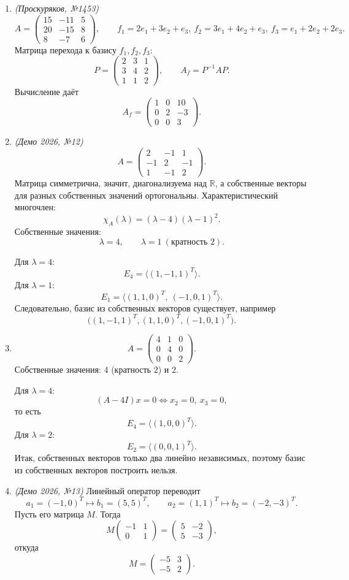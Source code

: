 \begin{enumerate}
\item \textit{(Проскуряков, №1453)}
\[
A=\begin{pmatrix}
15&-11&5\\
20&-15&8\\
8&-7&6
\end{pmatrix},\qquad
f_1=2e_1+3e_2+e_3,\ 
f_2=3e_1+4e_2+e_3,\ 
f_3=e_1+2e_2+2e_3.
\]
Матрица перехода к базису \(f_1,f_2,f_3\):
\[
P=\begin{pmatrix}
2&3&1\\
3&4&2\\
1&1&2
\end{pmatrix},
\qquad
A_f=P^{-1}AP.
\]
Вычисление даёт
\[
A_f=
\begin{pmatrix}
1&0&10\\
0&2&-3\\
0&0&3
\end{pmatrix}.
\]

\item \textit{(Демо 2026, №12)}
\[
A=\begin{pmatrix}
2&-1&1\\
-1&2&-1\\
1&-1&2
\end{pmatrix}.
\]
Матрица симметрична, значит, диагонализуема над \(\mathbb R\), а собственные векторы для разных собственных значений ортогональны.
Характеристический многочлен:
\[
\chi_A(\lambda)=(\lambda-4)(\lambda-1)^2.
\]
Собственные значения:
\[
\lambda=4,\qquad \lambda=1 \ (\text{кратность }2).
\]

Для \(\lambda=4\):
\[
E_4=\langle (1,-1,1)^T\rangle.
\]
Для \(\lambda=1\):
\[
E_1=\langle (1,1,0)^T,\ (-1,0,1)^T\rangle.
\]
Следовательно, базис из собственных векторов существует, например
\[
\bigl((1,-1,1)^T,(1,1,0)^T,(-1,0,1)^T\bigr).
\]

\item
\[
A=\begin{pmatrix}
4&1&0\\
0&4&0\\
0&0&2
\end{pmatrix}.
\]
Собственные значения: \(4\) (кратность \(2\)) и \(2\).

Для \(\lambda=4\):
\[
(A-4I)x=0 \iff x_2=0,\ x_3=0,
\]
то есть
\[
E_4=\langle (1,0,0)^T\rangle.
\]
Для \(\lambda=2\):
\[
E_2=\langle (0,0,1)^T\rangle.
\]
Итак, собственных векторов только два линейно независимых, поэтому базис из собственных векторов построить нельзя.

\item \textit{(Демо 2026, №13)}
Линейный оператор переводит
\[
a_1=(-1,0)^T\mapsto b_1=(5,5)^T,\qquad
a_2=(1,1)^T\mapsto b_2=(-2,-3)^T.
\]
Пусть его матрица \(M\). Тогда
\[
M\begin{pmatrix}-1&1\\0&1\end{pmatrix}
=\begin{pmatrix}5&-2\\5&-3\end{pmatrix},
\]
откуда
\[
M=\begin{pmatrix}-5&3\\-5&2\end{pmatrix}.
\]


\end{enumerate}
